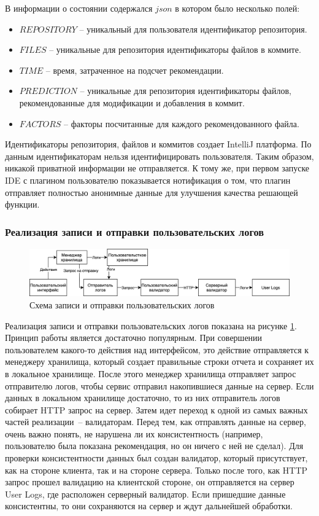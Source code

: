 В информации о состоянии содержался $json$ в котором было несколько полей:
    \begin{itemize}[label={\textbullet}]
        \item $REPOSITORY$ -- уникальный для пользователя идентификатор репозитория.
        \item $FILES$ -- уникальные для репозитория идентификаторы файлов в коммите.
        \item $TIME$ -- время, затраченное на подсчет рекомендации.
        \item $PREDICTION$ -- уникальные для репозитория идентификаторы файлов, рекомендованные для модификации и добавления в коммит.
        \item $FACTORS$ -- факторы посчитанные для каждого рекомендованного файла.
    \end{itemize}
Идентификаторы репозитория, файлов и коммитов создает IntelliJ платформа. По данным идентификаторам нельзя идентифицировать пользователя. Таким образом, никакой приватной информации не отправляется. К тому же, при первом запуске IDE с плагином пользователю показывается нотификация о том, что плагин отправляет полностью анонимные данные для улучшения качества решающей функции.
\subsubsection{Реализация записи и отправки пользовательских логов}
\begin{figure}[!h]
\caption{Схема записи и отправки пользовательских логов}\label{jet-stat-logs}
\centering
\includegraphics[scale=0.15]{User Logs.png}
\end{figure}
Реализация записи и отправки пользовательских логов показана на рисунке \ref{jet-stat-logs}. Принцип работы является достаточно популярным. При совершении пользователем какого-то действия над интерфейсом, это действие отправляется к менеджеру хранилища, который создает правильные строки отчета и сохраняет их в локальное хранилище. После этого менеджер хранилища отправляет запрос отправителю логов, чтобы сервис отправил накопившиеся данные на сервер. Если данных в локальном хранилище достаточно, то из них отправитель логов собирает HTTP запрос на сервер. Затем идет переход к одной из самых важных частей реализации~-- валидаторам. Перед тем, как отправлять данные на сервер, очень важно понять, не нарушена ли их консистентность (например, пользователю была показана рекомендация, но он ничего с ней не сделал). Для проверки консистентности данных был создан валидатор, который присутствует, как на стороне клиента, так и на стороне сервера. Только после того, как HTTP запрос прошел валидацию на клиентской стороне, он отправляется на сервер User Logs, где расположен серверный валидатор. Если пришедшие данные консистентны, то они сохраняются на сервер и ждут дальнейшей обработки.
